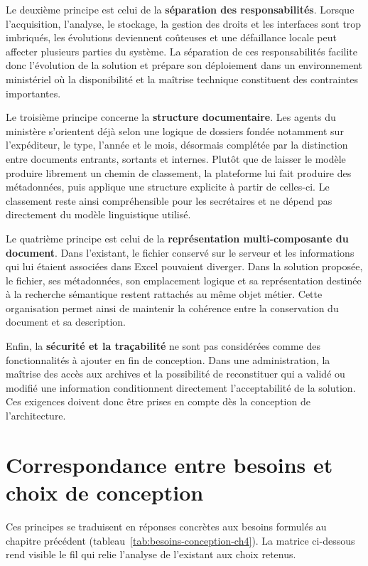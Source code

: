 Le deuxième principe est celui de la \textbf{séparation des responsabilités}. Lorsque l'acquisition, l'analyse, le stockage, la gestion des droits et les interfaces sont trop imbriqués, les évolutions deviennent coûteuses et une défaillance locale peut affecter plusieurs parties du système. La séparation de ces responsabilités facilite donc l'évolution de la solution et prépare son déploiement dans un environnement ministériel où la disponibilité et la maîtrise technique constituent des contraintes importantes.

Le troisième principe concerne la \textbf{structure documentaire}. Les agents du ministère s'orientent déjà selon une logique de dossiers fondée notamment sur l'expéditeur, le type, l'année et le mois, désormais complétée par la distinction entre documents entrants, sortants et internes. Plutôt que de laisser le modèle produire librement un chemin de classement, la plateforme lui fait produire des métadonnées, puis applique une structure explicite à partir de celles-ci. Le classement reste ainsi compréhensible pour les secrétaires et ne dépend pas directement du modèle linguistique utilisé.

Le quatrième principe est celui de la \textbf{représentation multi-composante du document}. Dans l'existant, le fichier conservé sur le serveur et les informations qui lui étaient associées dans Excel pouvaient diverger. Dans la solution proposée, le fichier, ses métadonnées, son emplacement logique et sa représentation destinée à la recherche sémantique restent rattachés au même objet métier. Cette organisation permet ainsi de maintenir la cohérence entre la conservation du document et sa description.

Enfin, la \textbf{sécurité et la traçabilité} ne sont pas considérées comme des fonctionnalités à ajouter en fin de conception. Dans une administration, la maîtrise des accès aux archives et la possibilité de reconstituer qui a validé ou modifié une information conditionnent directement l'acceptabilité de la solution. Ces exigences doivent donc être prises en compte dès la conception de l'architecture.

\section{Correspondance entre besoins et choix de conception}

Ces principes se traduisent en réponses concrètes aux besoins formulés au chapitre précédent (tableau~\ref{tab:besoins-conception-ch4}). La matrice ci-dessous rend visible le fil qui relie l'analyse de l'existant aux choix retenus.

